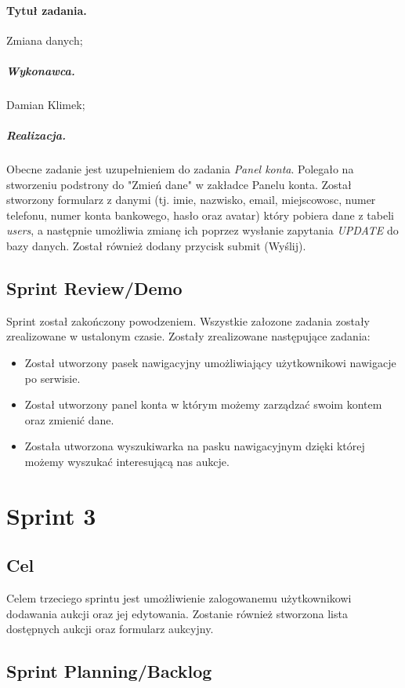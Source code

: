 \documentclass[a4paper]{article}
\begin{document}
	\paragraph{Tytuł zadania.} Zmiana danych;
	\subparagraph{Wykonawca.} Damian Klimek;
	\subparagraph{Realizacja.} Obecne zadanie jest uzupełnieniem do zadania \emph{Panel konta}. Polegało na stworzeniu podstrony do "Zmień dane" w zakładce Panelu konta. Został stworzony formularz z danymi (tj. imie, nazwisko, email, miejscowosc, numer telefonu, numer konta bankowego, hasło oraz avatar) który pobiera dane z tabeli \emph{users}, a następnie umożliwia zmianę ich poprzez wysłanie zapytania \emph{UPDATE} do bazy danych. Został również dodany przycisk submit (Wyślij).
	
	\subsection{Sprint Review/Demo}
	
	Sprint został zakończony powodzeniem. Wszystkie załozone zadania zostały zrealizowane w ustalonym czasie. Zostały zrealizowane następujące zadania:
	
\begin{itemize}

\item Został utworzony pasek nawigacyjny umożliwiający użytkownikowi nawigacje po serwisie.
\item Został utworzony panel konta w którym możemy zarządzać swoim kontem oraz zmienić dane.
\item Została utworzona wyszukiwarka na pasku nawigacyjnym dzięki której możemy wyszukać interesującą nas aukcje.

\end{itemize}
	
	\section{Sprint 3}
	
	\subsection{Cel} Celem trzeciego sprintu jest umożliwienie zalogowanemu użytkownikowi dodawania aukcji oraz jej edytowania. Zostanie również stworzona lista dostępnych aukcji oraz formularz aukcyjny.
	
	\subsection{Sprint Planning/Backlog}
	
\end{document}
